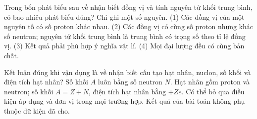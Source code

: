 \begin{ex}
Trong bốn phát biểu sau về nhận biết đồng vị và tính nguyên tử khối trung bình, có bao nhiêu phát biểu đúng? Chỉ ghi một số nguyên. (1) Các đồng vị của một nguyên tố có số proton khác nhau. (2) Các đồng vị có cùng số proton nhưng khác số neutron; nguyên tử khối trung bình là trung bình có trọng số theo tỉ lệ đồng vị. (3) Kết quả phải phù hợp ý nghĩa vật lí. (4) Mọi đại lượng đều có cùng bản chất.
\end{ex}

\begin{ex}
Kết luận đúng khi vận dụng là về nhận biết cấu tạo hạt nhân, nuclon, số khối và điện tích hạt nhân?
\choice
{Số khối $A$ luôn bằng số neutron $N$.}
{\True Hạt nhân gồm proton và neutron; số khối $A=Z+N$, điện tích hạt nhân bằng $+Ze$.}
{Có thể bỏ qua điều kiện áp dụng và đơn vị trong mọi trường hợp.}
{Kết quả của bài toán không phụ thuộc dữ kiện đã cho.}
\end{ex}

